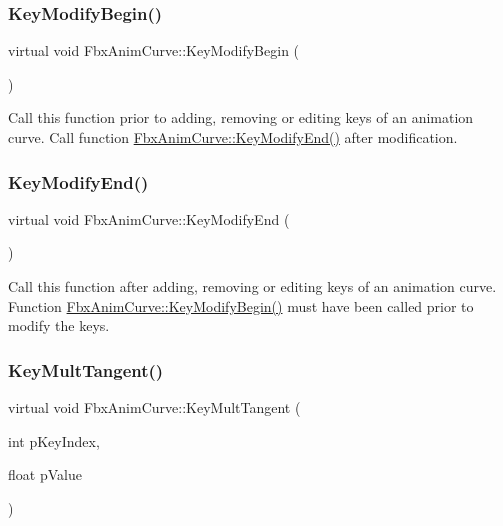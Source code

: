 \subsubsection{\texorpdfstring{Key\+Modify\+Begin()}{KeyModifyBegin()}}
{\footnotesize\ttfamily virtual void Fbx\+Anim\+Curve\+::\+Key\+Modify\+Begin (\begin{DoxyParamCaption}{ }\end{DoxyParamCaption})\hspace{0.3cm}{\ttfamily [pure virtual]}}

Call this function prior to adding, removing or editing keys of an animation curve. Call function \hyperlink{class_fbx_anim_curve_ae8776e18ed1933e258774ba44f64fe5d}{Fbx\+Anim\+Curve\+::\+Key\+Modify\+End()} after modification. \mbox{\label{class_fbx_anim_curve_ae8776e18ed1933e258774ba44f64fe5d}} 
\subsubsection{\texorpdfstring{Key\+Modify\+End()}{KeyModifyEnd()}}
{\footnotesize\ttfamily virtual void Fbx\+Anim\+Curve\+::\+Key\+Modify\+End (\begin{DoxyParamCaption}{ }\end{DoxyParamCaption})\hspace{0.3cm}{\ttfamily [pure virtual]}}

Call this function after adding, removing or editing keys of an animation curve. Function \hyperlink{class_fbx_anim_curve_ac75a9aaa2edc08635c0a9fadbd628923}{Fbx\+Anim\+Curve\+::\+Key\+Modify\+Begin()} must have been called prior to modify the keys. \mbox{\label{class_fbx_anim_curve_a743514eebf5845d6bc13145e082a8ae5}} 
\subsubsection{\texorpdfstring{Key\+Mult\+Tangent()}{KeyMultTangent()}}
{\footnotesize\ttfamily virtual void Fbx\+Anim\+Curve\+::\+Key\+Mult\+Tangent (\begin{DoxyParamCaption}\item[{int}]{p\+Key\+Index,  }\item[{float}]{p\+Value }\end{DoxyParamCaption})\hspace{0.3cm}{\ttfamily [pure virtual]}}

